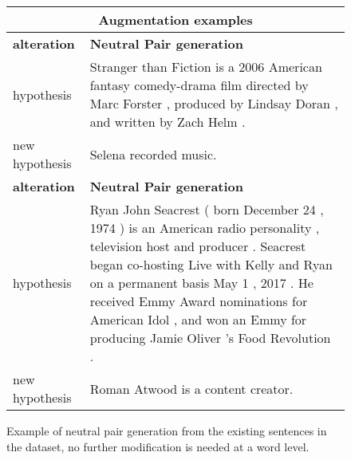 \documentclass[11pt,a4paper]{article}
\begin{document}
\begin{figure*}[t]
    \centering
    \begin{adjustbox}{width=\textwidth}
    \begin{tabular}{|p{}|p{}|}
    \hline
    \multicolumn{2}{|c|}{\textbf{Augmentation examples}} \\
    \hline
    \textbf{alteration} & \textbf{Neutral Pair generation} \\
    hypothesis & Stranger than Fiction is a 2006 American fantasy comedy-drama film directed by Marc Forster , produced by Lindsay Doran , and written by Zach Helm . \\
    new hypothesis & Selena recorded music. \\ 
    \hline
    \textbf{alteration} & \textbf{Neutral Pair generation} \\
    hypothesis & Ryan John Seacrest ( born December 24 , 1974 ) is an American radio personality , television host and producer . Seacrest began co-hosting Live with Kelly and Ryan on a permanent basis May 1 , 2017 . He received Emmy Award nominations for American Idol , and won an Emmy for producing Jamie Oliver 's Food Revolution . \\
    new hypothesis & Roman Atwood is a content creator. \\
    \hline
    \end{tabular}
    \end{adjustbox}
    \caption{Example of neutral pair generation from the existing sentences in the dataset, no further modification is needed at a word level.}
    \label{fig:alteration-examples}
    \end{figure*}
\end{document}
